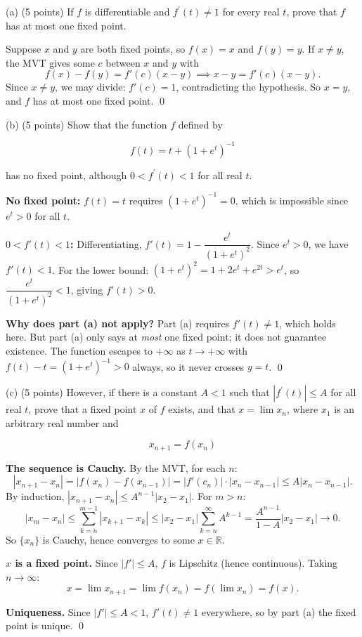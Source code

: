 \documentclass[10pt]{article}
\newcommand{\R}{\mathbb{R}}
\newenvironment{solution}{%
  \par\medskip\noindent{\color{red}\textbf{Solution.}}\color{red}\;}%
  {\par\medskip}
\begin{document}
(a) (5 points) If $f$ is differentiable and $f^{\prime}(t) \neq 1$ for every real $t$, prove that $f$ has at most one fixed point.

\begin{solution}
Suppose $x$ and $y$ are both fixed points, so $f(x) = x$ and $f(y) = y$. If $x \neq y$, the MVT gives some $c$ between $x$ and $y$ with
$$
f(x) - f(y) = f'(c)(x - y) \implies x - y = f'(c)(x-y).
$$
Since $x \neq y$, we may divide: $f'(c) = 1$, contradicting the hypothesis. So $x = y$, and $f$ has at most one fixed point. \qed
\end{solution}

(b) (5 points) Show that the function $f$ defined by

$$
f(t)=t+\left(1+e^{t}\right)^{-1}
$$

has no fixed point, although $0<f^{\prime}(t)<1$ for all real $t$.

\begin{solution}
\textbf{No fixed point:} $f(t) = t$ requires $(1+e^t)^{-1} = 0$, which is impossible since $e^t > 0$ for all $t$.

\textbf{$0 < f'(t) < 1$:} Differentiating, $f'(t) = 1 - \dfrac{e^t}{(1+e^t)^2}$. Since $e^t > 0$, we have $f'(t) < 1$. For the lower bound: $(1+e^t)^2 = 1 + 2e^t + e^{2t} > e^t$, so $\dfrac{e^t}{(1+e^t)^2} < 1$, giving $f'(t) > 0$.

\textbf{Why does part (a) not apply?} Part (a) requires $f'(t) \neq 1$, which holds here. But part (a) only says at \emph{most} one fixed point; it does not guarantee existence. The function escapes to $+\infty$ as $t \to +\infty$ with $f(t) - t = (1+e^t)^{-1} > 0$ always, so it never crosses $y = t$. \qed
\end{solution}

(c) (5 points) However, if there is a constant $A<1$ such that $\left|f^{\prime}(t)\right| \leq A$ for all real $t$, prove that a fixed point $x$ of $f$ exists, and that $x=\lim x_{n}$, where $x_{1}$ is an arbitrary real number and

$$
x_{n+1}=f\left(x_{n}\right)
$$

\begin{solution}
\textbf{The sequence is Cauchy.} By the MVT, for each $n$:
$$
|x_{n+1} - x_n| = |f(x_n) - f(x_{n-1})| = |f'(c_n)| \cdot |x_n - x_{n-1}| \leq A|x_n - x_{n-1}|.
$$
By induction, $|x_{n+1} - x_n| \leq A^{n-1}|x_2 - x_1|$. For $m > n$:
$$
|x_m - x_n| \leq \sum_{k=n}^{m-1}|x_{k+1}-x_k| \leq |x_2 - x_1|\sum_{k=n}^{\infty}A^{k-1} = \frac{A^{n-1}}{1-A}|x_2-x_1| \to 0.
$$
So $\{x_n\}$ is Cauchy, hence converges to some $x \in \R$.

\textbf{$x$ is a fixed point.} Since $|f'| \leq A$, $f$ is Lipschitz (hence continuous). Taking $n \to \infty$:
$$
x = \lim x_{n+1} = \lim f(x_n) = f\!\left(\lim x_n\right) = f(x).
$$

\textbf{Uniqueness.} Since $|f'| \leq A < 1$, $f'(t) \neq 1$ everywhere, so by part (a) the fixed point is unique. \qed
\end{solution}
\end{document}

